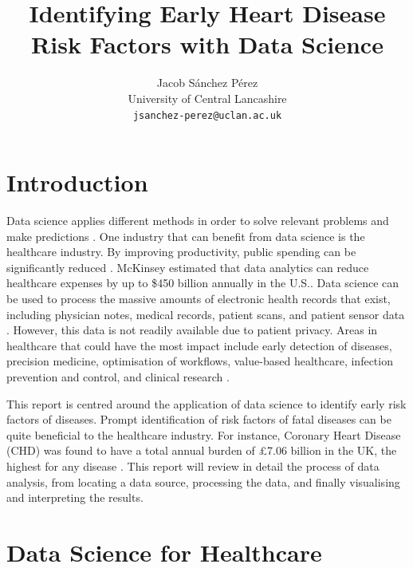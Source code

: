 \documentclass[a4paper,12pt]{article}
\title{Identifying Early Heart Disease Risk Factors with Data Science}
\author{Jacob Sánchez Pérez\\ University of Central Lancashire\\\texttt{jsanchez-perez@uclan.ac.uk}}
\date{}
\begin{document}
\maketitle


\section{Introduction}



Data science applies different methods in order to solve relevant problems and
make predictions \parencite[78]{Waller2013}.
One industry that can benefit from data science is the healthcare industry.
By improving productivity, public spending can be significantly reduced \parencite{oecd2010health}.
McKinsey estimated that data analytics can reduce healthcare expenses by up to
\$450 billion annually in the U.S.\parencite{Groves2013}.
Data science can be used to process the massive amounts of electronic health
records that exist, including physician notes, medical records, patient scans,
and patient sensor data \parencite{Adam2017, Dalianis2015}.
However, this data is not readily available due to patient privacy.
Areas in healthcare that could have the most impact include early detection of
diseases, precision medicine, optimisation of workflows, value-based healthcare,
infection prevention and control, and clinical research \parencite[9]{Consoli2019}.

This report is centred around the application of data science to identify early
risk factors of diseases.
Prompt identification of risk factors of fatal diseases can be quite beneficial
to the healthcare industry.
For instance, Coronary Heart Disease (CHD) was found to have a total annual
burden of £7.06 billion in the UK, the highest for any disease \parencite{Liu2002}.
This report will review in detail the process of data analysis, from locating a
data source, processing the data, and finally visualising and interpreting the results.

\section{Data Science for Healthcare}

\end{document}
